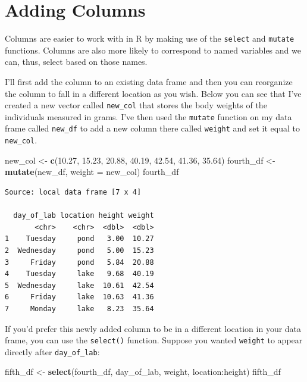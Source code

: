 \documentclass[twoside, 12pt]{article}
\newenvironment{Shaded}{\begin{snugshade}}{\end{snugshade}}
\newcommand{\KeywordTok}[1]{\textcolor[rgb]{0.13,0.29,0.53}{\textbf{{#1}}}}
\newcommand{\DataTypeTok}[1]{\textcolor[rgb]{0.13,0.29,0.53}{{#1}}}
\newcommand{\FloatTok}[1]{\textcolor[rgb]{0.00,0.00,0.81}{{#1}}}
\newcommand{\StringTok}[1]{\textcolor[rgb]{0.31,0.60,0.02}{{#1}}}
\newcommand{\NormalTok}[1]{{#1}}
\newcommand{\nonumsection}[1]{
  \addtocontents{toc}{\protect\setcounter{tocdepth}{-1}}
  \section{#1}
  \addtocontents{toc}{\protect\setcounter{tocdepth}{1}}
}
\begin{document}
\nonumsection{Adding Columns}

Columns are easier to work with in R by making use of the
\texttt{select} and \texttt{mutate} functions. Columns are also more
likely to correspond to named variables and we can, thus, select based
on those names.

I'll first add the column to an existing data frame and then you can
reorganize the column to fall in a different location as you wish. Below
you can see that I've created a new vector called \texttt{new\_col} that
stores the body weights of the individuals measured in grams. I've then
used the \texttt{mutate} function on my data frame called
\texttt{new\_df} to add a new column there called \texttt{weight} and
set it equal to \texttt{new\_col}.

\begin{Shaded}
\begin{Highlighting}[]
\NormalTok{new_col <-}\StringTok{ }\KeywordTok{c}\NormalTok{(}\FloatTok{10.27}\NormalTok{, }\FloatTok{15.23}\NormalTok{, }\FloatTok{20.88}\NormalTok{, }\FloatTok{40.19}\NormalTok{, }\FloatTok{42.54}\NormalTok{, }\FloatTok{41.36}\NormalTok{, }\FloatTok{35.64}\NormalTok{)}
\NormalTok{fourth_df <-}\StringTok{ }\KeywordTok{mutate}\NormalTok{(new_df, }\DataTypeTok{weight =} \NormalTok{new_col)}
\NormalTok{fourth_df}
\end{Highlighting}
\end{Shaded}

\begin{Verbatim}[frame=single]
Source: local data frame [7 x 4]

  day_of_lab location height weight
       <chr>    <chr>  <dbl>  <dbl>
1    Tuesday     pond   3.00  10.27
2  Wednesday     pond   5.00  15.23
3     Friday     pond   5.84  20.88
4    Tuesday     lake   9.68  40.19
5  Wednesday     lake  10.61  42.54
6     Friday     lake  10.63  41.36
7     Monday     lake   8.23  35.64
\end{Verbatim}

If you'd prefer this newly added column to be in a different location in
your data frame, you can use the \texttt{select()} function. Suppose you
wanted \texttt{weight} to appear directly after \texttt{day\_of\_lab}:

\begin{Shaded}
\begin{Highlighting}[]
\NormalTok{fifth_df <-}\StringTok{ }\KeywordTok{select}\NormalTok{(fourth_df, }
                   \NormalTok{day_of_lab, weight, location:height)}
\NormalTok{fifth_df}
\end{Highlighting}
\end{Shaded}
\end{document}
